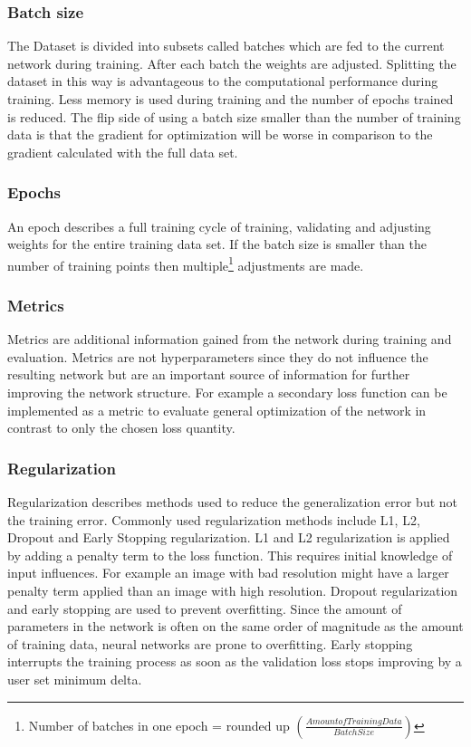 			\subsubsection{Batch size}
				The Dataset is divided into subsets called batches which are fed to the current network during training. After each batch the weights are adjusted. Splitting the dataset in this way is advantageous to the computational performance during training. Less memory is used during training and the number of epochs trained is reduced. The flip side of using a batch size smaller than the number of training data is that the gradient for optimization will be worse in comparison to the gradient calculated with the full data set. 
			\subsubsection{Epochs}
				An epoch describes a full training cycle of training, validating and adjusting weights for the entire training data set. If the batch size is smaller than the number of training points then multiple\footnote{Number of batches in one epoch = rounded up $\left(\frac{Amount of Training Data}{Batch Size}\right)$} adjustments are made.%
			\subsubsection{Metrics}
				Metrics are additional information gained from the network during training and evaluation. Metrics are not hyperparameters since they do not influence the resulting network but are an important source of information for further improving the network structure. For example a secondary loss function can be implemented as a metric to evaluate general optimization of the network in contrast to only the chosen loss quantity. 
			\subsubsection{Regularization}
				Regularization describes methods used to reduce the generalization error but not the training error. Commonly used regularization methods include L1, L2, Dropout and Early Stopping regularization. L1 and L2 regularization is applied by adding a penalty term to the loss function. This requires initial knowledge of input influences. For example an image with bad resolution might have a larger penalty term applied than an image with high resolution. Dropout regularization and early stopping are used to prevent overfitting. Since the amount of parameters in the network is often on the same order of magnitude as the amount of training data, neural networks are prone to overfitting. Early stopping interrupts the training process as soon as the validation loss stops improving by a user set minimum delta. 
